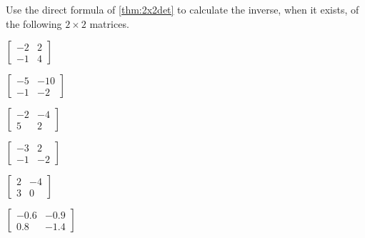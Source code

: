 \begin{exercise} \label{ex:2x2det} 
Use the direct formula of \autoref{thm:2x2det} to calculate the inverse, when it exists, of the following \(2\times2\) matrices.
\begin{parts}
\item \(\begin{bmatrix} -2&2
\\-1&4 \end{bmatrix}\)

\item \(\begin{bmatrix} -5&-10
\\-1&-2 \end{bmatrix}\)

\item \(\begin{bmatrix} -2&-4
\\5&2 \end{bmatrix}\)

\item \(\begin{bmatrix} -3&2
\\-1&-2 \end{bmatrix}\)

\item \(\begin{bmatrix} 2&-4
\\3&0 \end{bmatrix}\)

\item \(\begin{bmatrix} -0.6&-0.9
\\0.8&-1.4 \end{bmatrix}\)


\end{parts}
\end{exercise}
